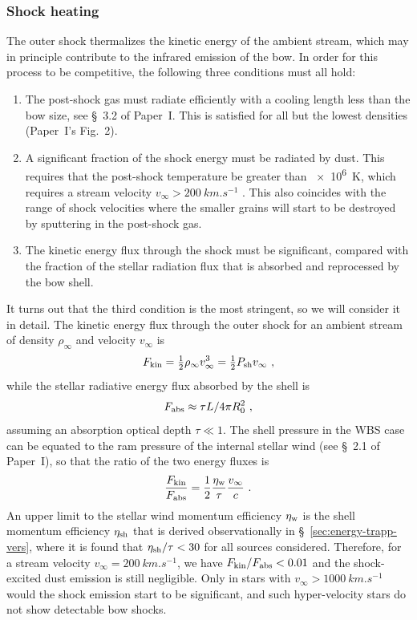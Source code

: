 \subsubsection{Shock heating}
\newcommand\kin{\ensuremath{_{\text{kin}}}}
The outer shock thermalizes the kinetic energy of the ambient stream,
which may in principle contribute to the infrared emission of the bow.
In order for this process to be competitive, the following three
conditions must all hold:
\begin{enumerate}[1.]
\item The post-shock gas must radiate efficiently with a cooling
  length less than the bow size, see \S~3.2 of Paper~I.\@
  This is satisfied for all but the lowest densities (Paper~I's
  Fig.~2).
\item A significant fraction of the shock energy must be radiated by
  dust.  This requires that the post-shock temperature be greater than
  \SI{e6}{K}, which requires a stream velocity
  \(v_\infty > \SI{200}{km.s^{-1}}\) \citep{Draine:1981a}.  This also
  coincides with the range of shock velocities where the smaller
  grains will start to be destroyed by sputtering in the post-shock
  gas.
\item The kinetic energy flux through the shock must be significant,
  compared with the fraction of the stellar radiation flux that is
  absorbed and reprocessed by the bow shell.
\end{enumerate}
It turns out that the third condition is the most stringent, so we
will consider it in detail.  The kinetic energy flux through the outer shock for an ambient stream of density \(\rho_\infty\) and velocity \(v_\infty\) is
\begin{equation}
  \label{eq:Fkin}
  F\ke = \tfrac12 \rho_\infty v_\infty^3 = \tfrac12 P\shell v_\infty \ , 
\end{equation}
while the stellar radiative energy flux absorbed by the shell is
\begin{equation}
  \label{eq:Ftrap}
  F_{\text{abs}} \approx \tau L / 4 \pi R_0^2 \ ,
\end{equation}
assuming an absorption optical depth \(\tau \ll 1\). The shell
pressure in the WBS case can be equated to the ram pressure of the
internal stellar wind (see
\S~2.1 of Paper~I), so that the ratio of the two energy fluxes is
\begin{equation}
  \label{eq:F-ratio-shock}
  \frac{F_{\text{kin}}}{F_{\text{abs}}} = \frac12 \frac{\eta_{\text{w}}}{\tau} \frac{v_\infty}{c} \ .
\end{equation}
An upper limit to the stellar wind momentum efficiency \(\eta_{\text{w}}\) is
the shell momentum efficiency \(\eta_{\text{sh}}\) that is derived
observationally in \S~\ref{sec:energy-trapp-vers}, where it is found
that \(\eta_{\text{sh}} / \tau < 30\) for all sources considered.  Therefore, for
a stream velocity \(v_\infty = \SI{200}{km.s^{-1}}\), we have
\(F_{\text{kin}}/F_{\text{abs}} < 0.01\) and the shock-excited dust emission is still
negligible.  Only in stars with \(v_\infty > \SI{1000}{km.s^{-1}}\) would
the shock emission start to be significant, and such hyper-velocity
stars \citep{Brown:2015a} do not show detectable bow shocks.

